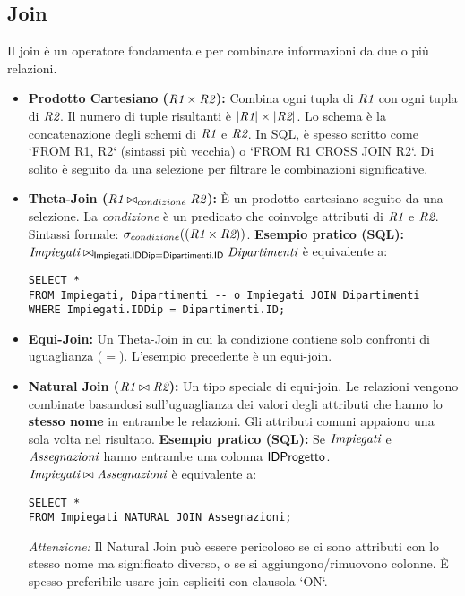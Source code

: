 	\subsection{Join}
	Il join è un operatore fondamentale per combinare informazioni da due o più relazioni.
	\begin{itemize}
		\item \textbf{Prodotto Cartesiano ($\textit{R1} \times \textit{R2}$):}
		Combina ogni tupla di $\textit{R1}$ con ogni tupla di $\textit{R2}$. Il numero di tuple risultanti è $|\textit{R1}| \times |\textit{R2}|$. Lo schema è la concatenazione degli schemi di $\textit{R1}$ e $\textit{R2}$.
		In SQL, è spesso scritto come `FROM R1, R2` (sintassi più vecchia) o `FROM R1 CROSS JOIN R2`. Di solito è seguito da una selezione per filtrare le combinazioni significative.
		
		\item \textbf{Theta-Join ($\textit{R1} \bowtie_{condizione} \textit{R2}$):}
		È un prodotto cartesiano seguito da una selezione. La \textit{condizione} è un predicato che coinvolge attributi di $\textit{R1}$ e $\textit{R2}$.
		Sintassi formale: $\sigma_{condizione}((\textit{R1} \times \textit{R2}))$.
		\textbf{Esempio pratico (SQL):}
		$\textit{Impiegati} \bowtie_{\textsf{Impiegati.IDDip} = \textsf{Dipartimenti.ID}} \textit{Dipartimenti}$
		è equivalente a:
		\begin{verbatim}
SELECT *
FROM Impiegati, Dipartimenti -- o Impiegati JOIN Dipartimenti
WHERE Impiegati.IDDip = Dipartimenti.ID;
		\end{verbatim}
		
		\item \textbf{Equi-Join:} Un Theta-Join in cui la condizione contiene solo confronti di uguaglianza ($=$). L'esempio precedente è un equi-join.
		
		\item \textbf{Natural Join ($\textit{R1} \bowtie \textit{R2}$):}
		Un tipo speciale di equi-join. Le relazioni vengono combinate basandosi sull'uguaglianza dei valori degli attributi che hanno lo \textbf{stesso nome} in entrambe le relazioni. Gli attributi comuni appaiono una sola volta nel risultato.
		\textbf{Esempio pratico (SQL):} Se $\textit{Impiegati}$ e $\textit{Assegnazioni}$ hanno entrambe una colonna $\textsf{IDProgetto}$.
		$\textit{Impiegati} \bowtie \textit{Assegnazioni}$
		è equivalente a:
		\begin{verbatim}
SELECT *
FROM Impiegati NATURAL JOIN Assegnazioni;
		\end{verbatim}
		\textit{Attenzione:} Il Natural Join può essere pericoloso se ci sono attributi con lo stesso nome ma significato diverso, o se si aggiungono/rimuovono colonne. È spesso preferibile usare join espliciti con clausola `ON`.
	\end{itemize}
	
